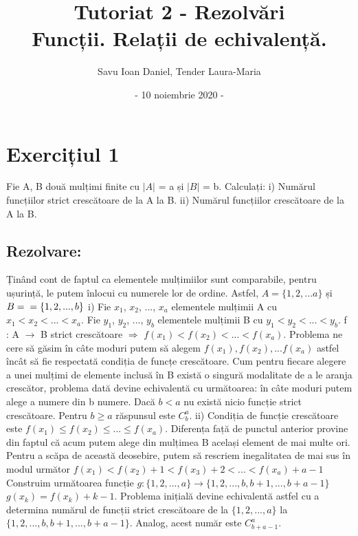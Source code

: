 \documentclass{article}
\title{Tutoriat 2 - Rezolvări\\
\Large Funcții. Relații de echivalență.}
\date{- 10 noiembrie 2020 -}
\author{Savu Ioan Daniel, Tender Laura-Maria}
\begin{document}
\maketitle

\section{Exercițiul 1}
Fie A, B două mulțimi finite cu $|A|$ = a și $|B|$ = b. Calculați:
\newline
i) Numărul funcțiilor strict crescătoare de la A la B.
\newline
ii) Numărul funcțiilor crescătoare de la A la B.

\subsection{Rezolvare:}
Ținând cont de faptul ca elementele mulțimiilor sunt comparabile, pentru ușurință, le putem înlocui cu numerele lor de ordine. Astfel, $A = \{1, 2, ... a\}$ și $B = \\ = \{1, 2, ..., b\}$
\newline
i) Fie $x_{1}$, $x_{2}$, ..., $x_{a}$ elementele mulțimii A cu $x_{1} < x_{2} < ... < x_{a}$. Fie $y_{1}$, $y_{2}$, ..., $y_{b}$ elementele mulțimii B cu $y_{1} < y_{2} < ... < y_{b}$. 
f : A $\rightarrow$ B strict crescătoare $\Rightarrow$ $f(x_{1}) <  f(x_{2}) < ... < f(x_{a})$.
\newline
Problema ne cere să găsim în câte moduri putem să alegem $f(x_{1}), f(x_{2}), ... f(x_{a})$ astfel încât să fie respectată condiția de funcțe crescătoare. Cum pentru fiecare alegere a unei mulțimi de elemente inclusă în B există o singură modalitate de a le aranja crescător, problema dată devine echivalentă cu următoarea: în câte moduri putem alege a numere din b numere. Dacă $b < a$ nu există nicio funcție strict crescătoare. Pentru $b \geq a$ răspunsul este $C^a_b$.
\flushleft
ii) Condiția de funcție crescătoare este $f(x_{1}) \leq  f(x_{2}) \leq ... \leq f(x_{a})$. Diferența față de punctul anterior provine din faptul că acum putem alege din mulțimea B același element de mai multe ori. Pentru a scăpa de această deosebire, putem să rescriem inegalitatea de mai sus în modul următor
\newline
$f(x_{1}) <  f(x_{2}) + 1 < f(x_{3}) + 2 <  ... < f(x_{a}) + a - 1$
\newline
Construim următoarea funcție $g : \{1, 2, ..., a\} \rightarrow \{1, 2, ..., b, b + 1, ..., b + a - 1\}$
\newline
$g(x_{k}) = f(x_k) + k - 1$. Problema inițială devine echivalentă astfel cu a determina numărul de funcții strict crescătoare de la $\{1, 2, ..., a\}$ la $\{1, 2, ..., b, b + 1, ..., b + a - 1\}$. Analog, acest număr este $C^a_{b + a - 1}$.
\end{document}
